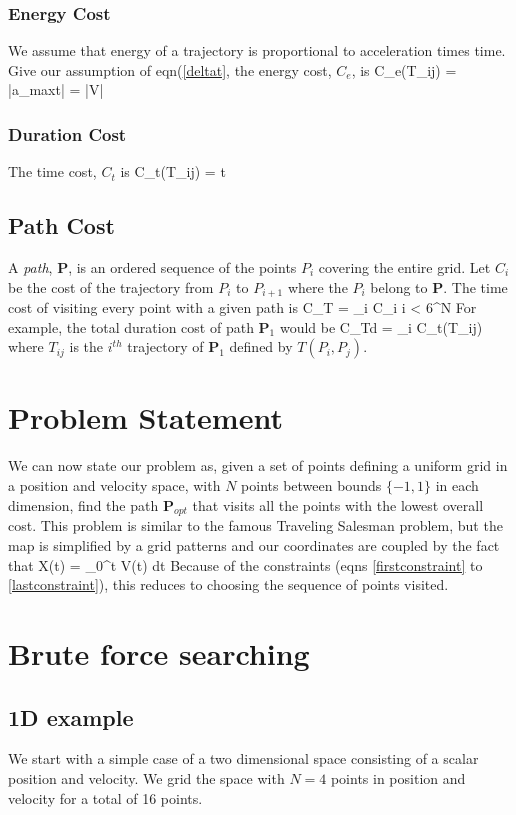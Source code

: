 \documentclass[letterpaper]{article}
\begin{document}
\subsubsection{Energy Cost}    We assume that energy of a trajectory is proportional to acceleration times time.  Give our assumption
of eqn(\ref{deltat}, the energy cost, $C_e$, is
\beq
C_{e}(T_{ij}) = |a_{max}\Delta t| = |\Delta V|
\eeq

\subsubsection{Duration Cost}   The time cost, $C_t$ is
\beq
C_t(T_{ij}) = \Delta t
\eeq

\subsection{Path Cost}
A {\it path}, $\mathbf{P}$, is an ordered sequence of the points $P_i$ covering the entire grid.
Let $C_i$ be the cost of the trajectory from $P_i$ to $P_{i+1}$ where the $P_i$ belong to $\mathbf{P}$.
The time   cost of visiting every point with a given path is
\beq
C_T = \Sigma_i C_i   \leq i < 6^N
\eeq
For example, the total duration cost of path $\mathbf{P}_1$ would be
\beq
C_{Td} = \Sigma_i C_t(T_{ij})
\eeq
where $T_{ij}$ is the $i^{th}$ trajectory of $\mathbf{P}_1$ defined by $T(P_i, P_j)$.

\section{Problem Statement}

We can now state our problem as, given a set of points defining a uniform grid in a position and velocity
space, with $N$ points between bounds $\{-1,1\}$ in each dimension, find the path $\mathbf{P}_{opt}$
that visits all the points with the lowest overall cost.   This problem is similar to the famous
Traveling Salesman problem, but the map is simplified by a grid patterns and our coordinates are coupled by
the fact that
\beq
X(t) = \int_0^t V(t) dt
\eeq
Because of the constraints (eqns \ref{firstconstraint} to \ref{lastconstraint}), this reduces to
choosing the sequence of points visited.


\section{Brute force searching}

\subsection{1D example}
We start with a simple case of a two dimensional space consisting of a scalar position and velocity.  We grid the
space with $N=4$ points in position and velocity for a total of 16 points.
\end{document}
